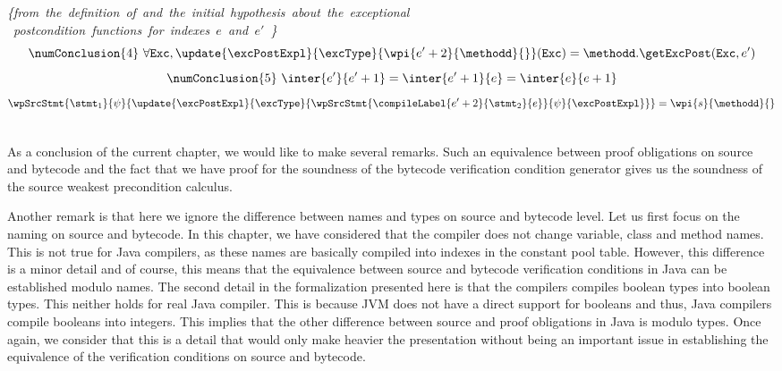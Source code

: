 \begin{description}
	      \mbox{\rm\textit{\{from the definition of \getExcPost{} and  the initial hypothesis about the exceptional }}\\
	      \mbox{\rm\textit{  postcondition functions for indexes $e$ and $e' $ \}}}
	    	     $$ \numConclusion{4} \ \forall \mbox{\rm\texttt{Exc}} ,  \update{\excPostExpl}{\excType}{ \wpi{e'+2}{\methodd}{} }(\mbox{\rm\texttt{Exc}}) = 
                  \methodd.\getExcPost(\mbox{\rm\texttt{Exc}}, e' )$$
	     $$ \numConclusion{5} \ \inter{e'}{e' + 1} = \inter{e'+1 }{e} = \inter{e}{e+1}$$
	      $$ \wpSrcStmt{\stmt_1 }
                         {  \psi}
			 {  \update{\excPostExpl}{\excType}{ \wpSrcStmt{\compileLabel{e'+2}{\stmt_2}{e} }{\psi}{\excPostExpl }} } =
			  \wpi{s}{\methodd}{}$$
	      
	   
\end{description}
\Qed \\

As a conclusion of the current chapter, we would like to make several remarks. 
Such an equivalence between proof obligations on source and bytecode and the fact that
we have proof for the soundness of the bytecode verification condition generator
 gives us the soundness of the source  weakest precondition calculus.  

Another remark is that here we ignore the difference between names and types on  source and bytecode level. 
Let us first focus on the naming on source and bytecode. 
In this chapter, we have considered that the compiler  does not change  variable, class and method  names.
 This is not true for Java compilers, as these names are basically compiled into 
indexes in the constant pool table. However, this difference is a minor detail and of course, this means that 
the equivalence between source and bytecode verification conditions in Java can be established modulo names.
The second detail in the formalization presented here is that the compilers compiles boolean types into boolean types.
This neither holds for real Java compiler. This is because JVM does not have a direct support  for booleans and thus,
Java compilers compile booleans into integers. This implies that the other difference between source and proof
obligations in Java is modulo types. Once again, we consider that this is a detail that would only make heavier
the presentation without being an important issue in establishing the equivalence of the verification conditions on source and bytecode. 
